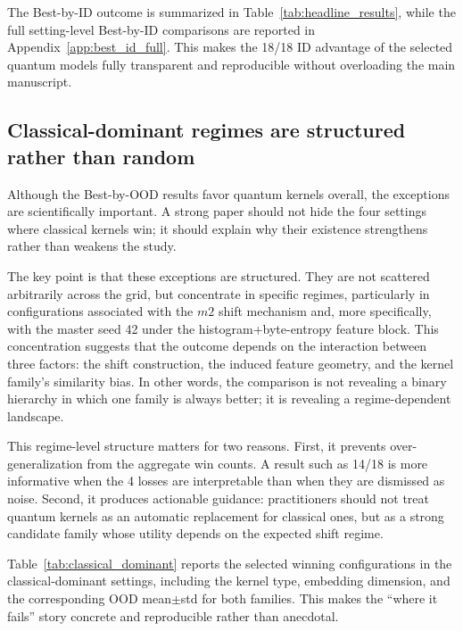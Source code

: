 \documentclass[pdflatex,sn-mathphys-num]{sn-jnl}%
\theoremstyle{thmstyleone}%
\theoremstyle{thmstyletwo}%
\theoremstyle{thmstylethree}%
\begin{document}
The Best-by-ID outcome is summarized in Table~\ref{tab:headline_results}, while the full setting-level Best-by-ID comparisons are reported in Appendix~\ref{app:best_id_full}. This makes the 18/18 ID advantage of the selected quantum models fully transparent and reproducible without overloading the main manuscript.

\subsection{Classical-dominant regimes are structured rather than random}

Although the Best-by-OOD results favor quantum kernels overall, the exceptions are scientifically important. A strong paper should not hide the four settings where classical kernels win; it should explain why their existence strengthens rather than weakens the study.

The key point is that these exceptions are structured. They are not scattered arbitrarily across the grid, but concentrate in specific regimes, particularly in configurations associated with the $m2$ shift mechanism and, more specifically, with the master seed 42 under the histogram+byte-entropy feature block. This concentration suggests that the outcome depends on the interaction between three factors: the shift construction, the induced feature geometry, and the kernel family's similarity bias. In other words, the comparison is not revealing a binary hierarchy in which one family is always better; it is revealing a regime-dependent landscape.

This regime-level structure matters for two reasons. First, it prevents over-generalization from the aggregate win counts. A result such as 14/18 is more informative when the 4 losses are interpretable than when they are dismissed as noise. Second, it produces actionable guidance: practitioners should not treat quantum kernels as an automatic replacement for classical ones, but as a strong candidate family whose utility depends on the expected shift regime.

Table~\ref{tab:classical_dominant} reports the selected winning configurations in the classical-dominant settings, including the kernel type, embedding dimension, and the corresponding OOD mean$\pm$std for both families. This makes the ``where it fails'' story concrete and reproducible rather than anecdotal.
\end{document}

